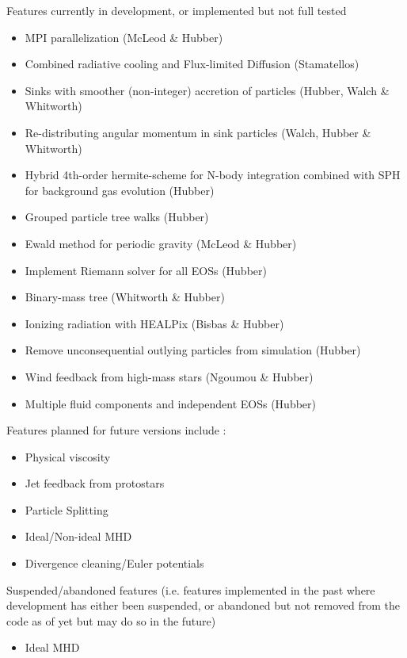 \documentclass[a4paper]{article}
\begin{document}
\noindent Features currently in development, or implemented but not full tested
\begin{itemize}
\item MPI parallelization (McLeod \& Hubber)
\item Combined radiative cooling and Flux-limited Diffusion (Stamatellos)
\item Sinks with smoother (non-integer) accretion of particles (Hubber, Walch \& Whitworth)
\item Re-distributing angular momentum in sink particles (Walch, Hubber \& Whitworth)
\item Hybrid 4th-order hermite-scheme for N-body integration combined with SPH for background gas evolution (Hubber)
\item Grouped particle tree walks (Hubber)
\item Ewald method for periodic gravity (McLeod \& Hubber)
\item Implement Riemann solver for all EOSs (Hubber)
\item Binary-mass tree (Whitworth \& Hubber)
\item Ionizing radiation with HEALPix (Bisbas \& Hubber)
\item Remove unconsequential outlying particles from simulation (Hubber)
\item Wind feedback from high-mass stars (Ngoumou \& Hubber)
\item Multiple fluid components and independent EOSs (Hubber)
\end{itemize}

\noindent Features planned for future versions include : 
\begin{itemize}
\item Physical viscosity
\item Jet feedback from protostars
\item Particle Splitting 
\item Ideal/Non-ideal MHD 
\item Divergence cleaning/Euler potentials
\end{itemize}


\noindent Suspended/abandoned features (i.e. features implemented in the past where development has either been suspended, or abandoned but not removed from the code as of yet but may do so in the future)
\begin{itemize}
\item Ideal MHD
\end{itemize}
\end{document}
